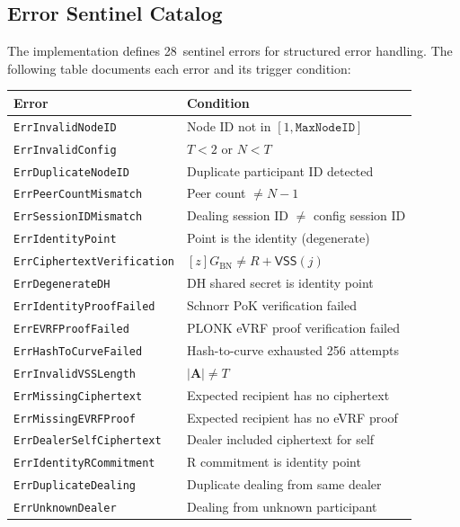 \documentclass[11pt,a4paper]{article}
\newcommand{\genbn}{G_{\mathrm{BN}}}
\newcommand{\VSS}{\mathsf{VSS}}
\begin{document}
\subsection{Error Sentinel Catalog}
\label{sec:errors}

The implementation defines 28~sentinel errors for structured error handling.
The following table documents each error and its trigger condition:

\begin{center}
\renewcommand{\arraystretch}{1.15}
\footnotesize
\begin{tabular}{@{}lp{7.5cm}@{}}
\toprule
\textbf{Error} & \textbf{Condition} \\
\midrule
\texttt{ErrInvalidNodeID} & Node ID not in $[1, \mathtt{MaxNodeID}]$ \\
\texttt{ErrInvalidConfig} & $T < 2$ or $N < T$ \\
\texttt{ErrDuplicateNodeID} & Duplicate participant ID detected \\
\texttt{ErrPeerCountMismatch} & Peer count $\ne N - 1$ \\
\texttt{ErrSessionIDMismatch} & Dealing session ID $\ne$ config session ID \\
\texttt{ErrIdentityPoint} & Point is the identity (degenerate) \\
\texttt{ErrCiphertextVerification} & $[z]\genbn \ne R + \VSS(j)$ \\
\texttt{ErrDegenerateDH} & DH shared secret is identity point \\
\texttt{ErrIdentityProofFailed} & Schnorr PoK verification failed \\
\texttt{ErrEVRFProofFailed} & PLONK eVRF proof verification failed \\
\texttt{ErrHashToCurveFailed} & Hash-to-curve exhausted 256 attempts \\
\texttt{ErrInvalidVSSLength} & $|\mathbf{A}| \ne T$ \\
\texttt{ErrMissingCiphertext} & Expected recipient has no ciphertext \\
\texttt{ErrMissingEVRFProof} & Expected recipient has no eVRF proof \\
\texttt{ErrDealerSelfCiphertext} & Dealer included ciphertext for self \\
\texttt{ErrIdentityRCommitment} & R commitment is identity point \\
\texttt{ErrDuplicateDealing} & Duplicate dealing from same dealer \\
\texttt{ErrUnknownDealer} & Dealing from unknown participant \\

\end{tabular}
\end{center}
\end{document}
